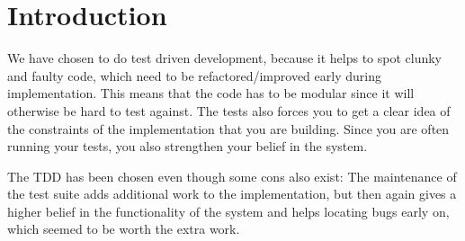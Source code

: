 \section{Introduction}
We have chosen to do test driven development, because it helps to spot clunky and faulty code, which need to be refactored/improved early during implementation.
This means that the code has to be modular since it will otherwise be hard to test against.
The tests also forces you to get a clear idea of the constraints of the implementation that you are building.
Since you are often running your tests, you also strengthen your belief in the system.

The TDD has been chosen even though some cons also exist:
The maintenance of the test suite adds additional work to the implementation, but then again gives a higher belief in the functionality of the system and helps locating bugs early on, which seemed to be worth the extra work.